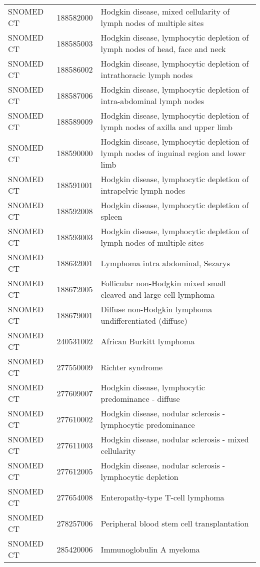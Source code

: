 \begin{table}[ht]
\begin{tabular}{lll}
  SNOMED CT & 188582000 & Hodgkin disease, mixed cellularity of lymph nodes of multiple sites \\ 
  SNOMED CT & 188585003 & Hodgkin disease, lymphocytic depletion of lymph nodes of head, face and neck \\ 
  SNOMED CT & 188586002 & Hodgkin disease, lymphocytic depletion of intrathoracic lymph nodes \\ 
  SNOMED CT & 188587006 & Hodgkin disease, lymphocytic depletion of intra-abdominal lymph nodes \\ 
  SNOMED CT & 188589009 & Hodgkin disease, lymphocytic depletion of lymph nodes of axilla and upper limb \\ 
  SNOMED CT & 188590000 & Hodgkin disease, lymphocytic depletion of lymph nodes of inguinal region and lower limb \\ 
  SNOMED CT & 188591001 & Hodgkin disease, lymphocytic depletion of intrapelvic lymph nodes \\ 
  SNOMED CT & 188592008 & Hodgkin disease, lymphocytic depletion of spleen \\ 
  SNOMED CT & 188593003 & Hodgkin disease, lymphocytic depletion of lymph nodes of multiple sites \\ 
  SNOMED CT & 188632001 & Lymphoma intra abdominal, Sezarys \\ 
  SNOMED CT & 188672005 & Follicular non-Hodgkin mixed small cleaved and large cell lymphoma \\ 
  SNOMED CT & 188679001 & Diffuse non-Hodgkin lymphoma undifferentiated (diffuse) \\ 
  SNOMED CT & 240531002 & African Burkitt lymphoma \\ 
  SNOMED CT & 277550009 & Richter syndrome \\ 
  SNOMED CT & 277609007 & Hodgkin disease, lymphocytic predominance - diffuse \\ 
  SNOMED CT & 277610002 & Hodgkin disease, nodular sclerosis - lymphocytic predominance \\ 
  SNOMED CT & 277611003 & Hodgkin disease, nodular sclerosis - mixed cellularity \\ 
  SNOMED CT & 277612005 & Hodgkin disease, nodular sclerosis - lymphocytic depletion \\ 
  SNOMED CT & 277654008 & Enteropathy-type T-cell lymphoma \\ 
  SNOMED CT & 278257006 & Peripheral blood stem cell transplantation \\ 
  SNOMED CT & 285420006 & Immunoglobulin A myeloma \\ 

\end{tabular}
\end{table}
